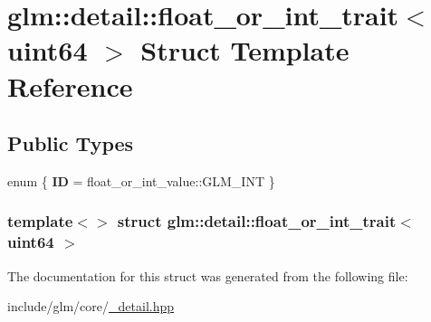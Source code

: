 \hypertarget{structglm_1_1detail_1_1float__or__int__trait_3_01uint64_01_4}{\section{glm\-:\-:detail\-:\-:float\-\_\-or\-\_\-int\-\_\-trait$<$ uint64 $>$ \-Struct \-Template \-Reference}
\label{structglm_1_1detail_1_1float__or__int__trait_3_01uint64_01_4}
}
\subsection*{\-Public \-Types}
\begin{DoxyCompactItemize}
\item 
enum \{ {\bfseries \-I\-D} =  float\-\_\-or\-\_\-int\-\_\-value\-:\-:\-G\-L\-M\-\_\-\-I\-N\-T
 \}
\end{DoxyCompactItemize}
\subsubsection*{template$<$$>$ struct glm\-::detail\-::float\-\_\-or\-\_\-int\-\_\-trait$<$ uint64 $>$}



\-The documentation for this struct was generated from the following file\-:\begin{DoxyCompactItemize}
\item 
include/glm/core/\hyperlink{__detail_8hpp}{\-\_\-detail.\-hpp}\end{DoxyCompactItemize}
